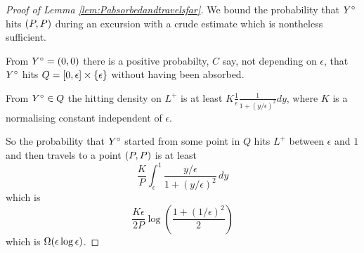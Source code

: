 {\begin{proof}[Proof of Lemma \ref{lem:Pabsorbedandtravelsfar}]
We bound the probability that $Y^\circ$ hits $(P,P)$ during an
excursion with a crude estimate which is nontheless sufficient.

From $Y^\circ = (0,0)$ there is a positive probabilty, $C$ say, not
depending on $\epsilon$, that $Y^\circ$ hits $Q = [0, \epsilon] \times
\{\epsilon\}$ without having been absorbed.

From $Y^\circ \in Q$ the hitting density on $L^+$ is at least $K
\frac{1}{\epsilon} \frac{1}{1 + (y/\epsilon)^2} dy$, where $K$ is a
normalising constant independent of $\epsilon$.

So the probability that $Y^\circ$ started from some point in $Q$ hits $L^+$
between $\epsilon$ and $1$ and then travels to a point $(P,P)$ is at least
\[
\frac{K}{P} \int_{\epsilon}^{1} \frac{y/\epsilon}{1 + (y/\epsilon)^2}
\, dy
\]
which is
\[
\frac{K\epsilon}{2P} \log\left(\frac{1 + (1/\epsilon)^2}{2}\right)
\]
which is $\Omega(\epsilon\log\epsilon)$.
\end{proof}
}

